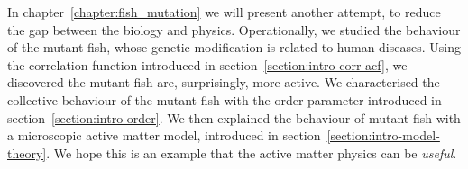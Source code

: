 \documentclass[11pt,twoside]{report}
\begin{document}

In chapter~\ref{chapter:fish_mutation} we will present another attempt, to reduce the gap between the biology and physics. 
Operationally, we studied the behaviour of the mutant fish, whose genetic modification is related to human diseases.
Using the correlation function introduced in section~\ref{section:intro-corr-acf}, we discovered the mutant fish are, surprisingly, more active.
We characterised the collective behaviour of the mutant fish with the order parameter introduced in section~\ref{section:intro-order}.
We then explained the behaviour of mutant fish with a microscopic active matter model, introduced in section~\ref{section:intro-model-theory}.
We hope this is an example that the active matter physics can be \emph{useful}.
\end{document}
